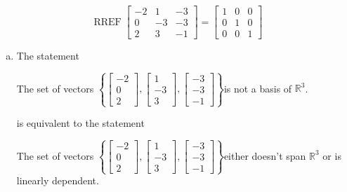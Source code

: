 \begin{exerciseAnswer} 


\[\operatorname{RREF} \left[\begin{array}{ccc}
-2 & 1 & -3 \\
0 & -3 & -3 \\
2 & 3 & -1
\end{array}\right] = \left[\begin{array}{ccc}
1 & 0 & 0 \\
0 & 1 & 0 \\
0 & 0 & 1
\end{array}\right] \]


\begin{enumerate}[(a)]
\item The statement 
\begin{center}\begin{minipage}{0.8\textwidth}
 The set of vectors \( \left\{ \left[\begin{array}{c}
-2 \\
0 \\
2
\end{array}\right] , \left[\begin{array}{c}
1 \\
-3 \\
3
\end{array}\right] , \left[\begin{array}{c}
-3 \\
-3 \\
-1
\end{array}\right] \right\} \)is not a basis of \(\mathbb{R}^3\). 
\end{minipage}\end{center}
     is equivalent to the statement 
\begin{center}\begin{minipage}{0.8\textwidth}
 The set of vectors \( \left\{ \left[\begin{array}{c}
-2 \\
0 \\
2
\end{array}\right] , \left[\begin{array}{c}
1 \\
-3 \\
3
\end{array}\right] , \left[\begin{array}{c}
-3 \\
-3 \\
-1
\end{array}\right] \right\} \)either doesn't span \(\mathbb{R}^3\) or is linearly dependent.
\end{minipage}\end{center}
    

\end{enumerate}
\end{exerciseAnswer}

